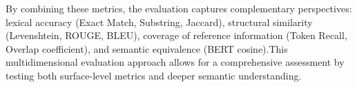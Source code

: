 By combining these metrics, the evaluation captures complementary perspectives:  
lexical accuracy (Exact Match, Substring, Jaccard), structural similarity (Levenshtein, ROUGE, BLEU), coverage of reference information (Token Recall, Overlap coefficient), and semantic equivalence (BERT cosine).This multidimensional evaluation approach allows for a comprehensive assessment by testing both surface-level metrics and deeper semantic understanding.




